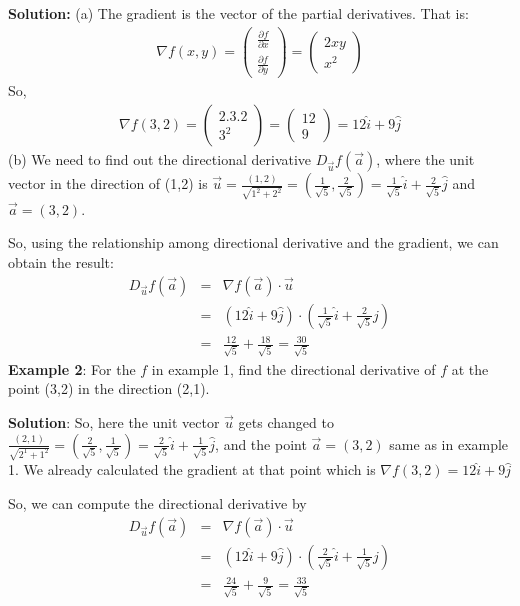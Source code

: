 \documentclass[conference,final,11pt,technote,onecolumn]{IEEEtran}\usepackage[]{graphicx}\usepackage[]{color}
\begin{document}
\textbf{Solution:} (a) The gradient is the vector of the partial derivatives. That is:
\begin{eqnarray}
\nonumber \nabla f(x,y) = \begin{pmatrix}
\frac{\partial f}{\partial x}\\
\frac{\partial f}{\partial y}
\end{pmatrix} = \begin{pmatrix}
2xy\\
x^2
\end{pmatrix}
\end{eqnarray}
So, 
\begin{eqnarray}
\nonumber \nabla f(3,2) = \begin{pmatrix}
2.3.2\\
3^2
\end{pmatrix} = \begin{pmatrix}
12\\
9
\end{pmatrix} = 12\hat{i} + 9\hat{j}
\end{eqnarray}
(b) We need to find out the directional derivative $D_{\vec u}f(\vec a)$, where the unit vector in the direction of (1,2) is $\vec u=\frac{(1,2)}{\sqrt{1^2+2^2}} = (\frac{1}{\sqrt{5}},\frac{2}{\sqrt{5}}) = \frac{1}{\sqrt{5}}\hat{i}+\frac{2}{\sqrt{5}}\hat{j}$ and  $\vec a = (3,2)$.

So, using the relationship among directional derivative and the gradient, we can obtain the result:
\begin{eqnarray}
\nonumber D_{\vec u}f(\vec a) &=& \nabla f(\vec a)\cdot \vec u\\
\nonumber &=& (12\hat{i}+9\hat{j})\cdot (\frac{1}{\sqrt{5}}\hat{i}+\frac{2}{\sqrt{5}}\hat{j})\\
\nonumber &=& \frac{12}{\sqrt{5}} + \frac{18}{\sqrt{5}} = \frac{30}{\sqrt{5}}
\nonumber 
\end{eqnarray}
\textbf{Example 2}: For the $f$ in example 1, find the directional derivative of $f$ at the point (3,2) in the direction (2,1).

\textbf{Solution}: So, here the unit vector $\vec u$ gets changed to $\frac{(2,1)}{\sqrt{2^1+1^2}} = (\frac{2}{\sqrt{5}},\frac{1}{\sqrt{5}}) = \frac{2}{\sqrt{5}}\hat{i} + \frac{1}{\sqrt{5}}\hat{j}$, and the point $\vec a = (3,2)$ same as in example 1. We already calculated the gradient at that point which is $\nabla f(3,2) = 12\hat{i}+9\hat{j}$

So, we can compute the directional derivative by
\begin{eqnarray}
\nonumber D_{\vec u}f(\vec a) &=& \nabla f(\vec a)\cdot \vec u\\
\nonumber &=& (12\hat{i}+9\hat{j})\cdot (\frac{2}{\sqrt{5}}\hat{i} + \frac{1}{\sqrt{5}}\hat{j})\\
\nonumber &=& \frac{24}{\sqrt{5}} + \frac{9}{\sqrt{5}} = \frac{33}{\sqrt{5}}
\end{eqnarray}
\end{document}
